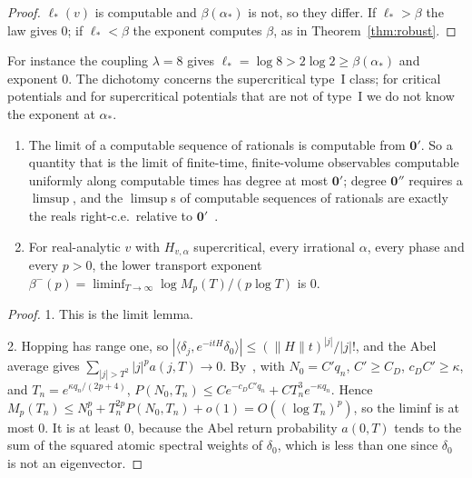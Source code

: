 \begin{proof}
$\ell_*(v)$ is computable and $\beta(\alpha_*)$ is not, so they differ. If $\ell_*>\beta$ the law gives $0$; if $\ell_*<\beta$ the exponent computes $\beta$, as in Theorem~\ref{thm:robust}.
\end{proof}

For instance the coupling $\lambda=8$ gives $\ell_*=\log8>2\log2\ge\beta(\alpha_*)$ and exponent $0$. The dichotomy concerns the supercritical type~I class; for critical potentials and for supercritical potentials that are not of type~I we do not know the exponent at $\alpha_*$.

\begin{theorem}\label{thm:exist}
\begin{enumerate}
\item The limit of a computable sequence of rationals is computable from $\mathbf 0'$. So a quantity that is the limit of finite-time, finite-volume observables computable uniformly along computable times has degree at most $\mathbf 0'$; degree $\mathbf 0''$ requires a $\limsup$, and the $\limsup$s of computable sequences of rationals are exactly the reals right-c.e.\ relative to $\mathbf 0'$~\cite[Lemma~11.1]{DMamo}.
\item For real-analytic $v$ with $H_{v,\alpha}$ supercritical, every irrational $\alpha$, every phase and every $p>0$, the lower transport exponent $\beta^-(p)=\liminf_{T\to\infty}\log M_p(T)/(p\log T)$ is $0$.
\end{enumerate}
\end{theorem}

\begin{proof}
1. This is the limit lemma.

2. Hopping has range one, so $|\langle\delta_j,e^{-itH}\delta_0\rangle|\le(\|H\|t)^{|j|}/|j|!$, and the Abel average gives $\sum_{|j|>T^2}|j|^pa(j,T)\to0$. By~\cite[Theorem~5.9]{DMuniv}, with $N_0=C'q_n$, $C'\ge C_D$, $c_DC'\ge\kappa$, and $T_n=e^{\kappa q_n/(2p+4)}$, $P(N_0,T_n)\le Ce^{-c_DC'q_n}+CT_n^3e^{-\kappa q_n}$. Hence $M_p(T_n)\le N_0^p+T_n^{2p}P(N_0,T_n)+o(1)=O((\log T_n)^p)$, so the liminf is at most $0$. It is at least $0$, because the Abel return probability $a(0,T)$ tends to the sum of the squared atomic spectral weights of $\delta_0$, which is less than one since $\delta_0$ is not an eigenvector.
\end{proof}

